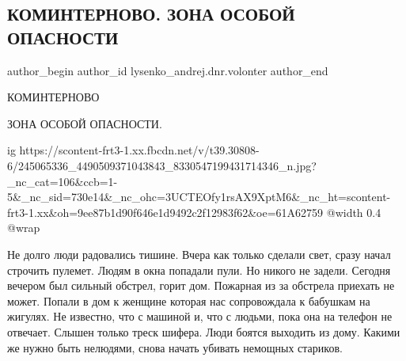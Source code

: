  
 
 
 
 
 
\subsection{КОМИНТЕРНОВО. ЗОНА ОСОБОЙ ОПАСНОСТИ}
\label{sec:11_10_2021.fb.lysenko_andrej.dnr.volonter.1.kominternovo}
 
\ifcmt
 author_begin
   author_id lysenko_andrej.dnr.volonter
 author_end
\fi

КОМИНТЕРНОВО

ЗОНА ОСОБОЙ ОПАСНОСТИ.

\ifcmt
  ig https://scontent-frt3-1.xx.fbcdn.net/v/t39.30808-6/245065336_4490509371043843_8330547199431714346_n.jpg?_nc_cat=106&ccb=1-5&_nc_sid=730e14&_nc_ohc=3UCTEOfy1rsAX9XptM6&_nc_ht=scontent-frt3-1.xx&oh=9ee87b1d90f646e1d9492c2f12983f62&oe=61A62759
  @width 0.4
  @wrap 
\fi

Не долго люди радовались тишине. Вчера как только сделали свет, сразу начал
строчить пулемет. Людям в окна попадали пули. Но никого не задели. Сегодня
вечером был сильный обстрел, горит дом. Пожарная из за обстрела приехать не
может. Попали в дом к женщине которая нас сопровождала к бабушкам на жигулях.
Не известно, что с машиной и, что с людьми, пока она на телефон не отвечает.
Слышен только треск шифера. Люди боятся выходить из дому. Какими же нужно быть
нелюдями, снова начать убивать немощных стариков.

